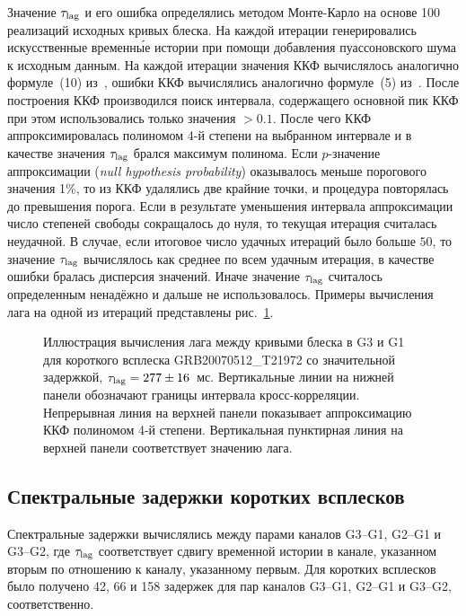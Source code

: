 Значение $\tau_{\mathrm{lag}}$ и его ошибка определялись методом Монте-Карло на основе 
100 реализаций исходных кривых блеска. 
На каждой итерации генерировались искусственные временн\'{ы}е истории 
при помощи добавления пуассоновского шума к исходным данным.
На каждой итерации значения ККФ вычислялось аналогично формуле~(10) из~\citep{Band_1997ApJ}, 
ошибки ККФ вычислялись аналогично формуле~(5) из~\citep{Fenimore_1995}.
После построения ККФ производился поиск интервала, содержащего основной пик ККФ
при этом использовались только значения $>0.1$.  
После чего ККФ аппроксимировалась полиномом 4-й степени на выбранном интервале
и в качестве значения $\tau_{\mathrm{lag}}$ брался максимум полинома.
Если $p$-значение аппроксимации (\textit{null hypothesis probability}) 
оказывалось меньше порогового значения 1\%, 
то из ККФ удалялись две крайние точки, и процедура повторялась до превышения порога. 
Если в результате уменьшения интервала аппроксимации число степеней свободы сокращалось до нуля,
то текущая итерация считалась неудачной. 
В случае, если итоговое число удачных итераций было больше $50$, то значение $\tau_{\mathrm{lag}}$ 
вычислялось как среднее по всем удачным итерация, в качестве ошибки бралась дисперсия значений.
Иначе значение $\tau_{\mathrm{lag}}$ считалось определенным ненадёжно и дальше не использовалось.
Примеры вычисления лага на одной из итераций представлены рис.~\ref{fig:lag_calculation}.

\begin{figure}[h]
  \caption{Иллюстрация вычисления лага между кривыми блеска в G3 и G1 
   для короткого всплеска GRB20070512\_T21972 со значительной задержкой, $\tau_{\mathrm{lag}}=277\pm16$~мс. 
  Вертикальные линии на нижней панели обозначают границы интервала кросс-корреляции. 
  Непрерывная линия на верхней панели показывает аппроксимацию ККФ полиномом 4-й степени. 
  Вертикальная пунктирная линия на верхней панели соответствует значению лага.
  \label{fig:lag_calculation}}  
\end{figure}

\subsection{Спектральные задержки коротких всплесков}
Спектральные задержки вычислялись между парами каналов G3--G1, G2--G1 и G3--G2, 
где $\tau_{\mathrm{lag}}$ соответствует сдвигу временной истории в канале, указанном вторым
по отношению к каналу, указанному первым. Для коротких всплесков было получено
42, 66 и 158 задержек для пар каналов G3--G1, G2--G1 и G3--G2, соответственно.

